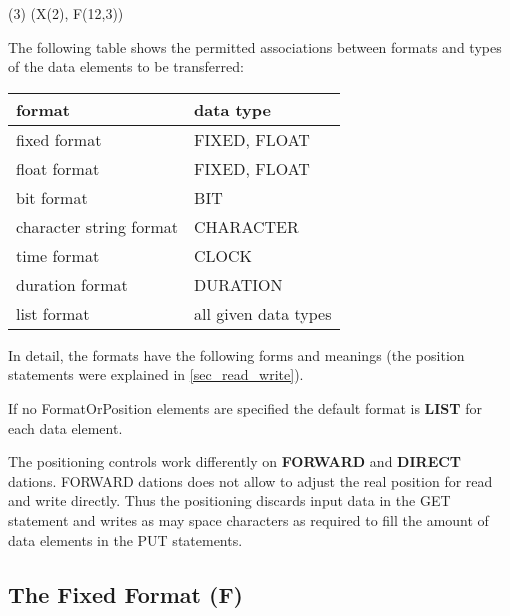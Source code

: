 (3) (X(2), F(12,3))

The following table shows the permitted associations between formats and
types of the data elements to be transferred:

\begin{tabular}{ll}
format                  & data type \\ \hline
fixed format            & FIXED, FLOAT \\
float format            & FIXED, FLOAT \\
bit format              & BIT          \\
character string format & CHARACTER    \\
time format             & CLOCK        \\
duration format         & DURATION     \\
list format             & all given data types
\end{tabular}

In detail, the formats have the following forms and meanings (the
position statements were explained in \ref{sec_read_write}).

\begin{modified}
If no FormatOrPosition elements are specified the default format is {\bf LIST}
 for each data element.
\end{modified}

The positioning controls work differently on {\bf FORWARD} and {\bf DIRECT}
dations. FORWARD dations does not allow to adjust the real position for read
and write directly. 
Thus the positioning discards input data in the GET statement and 
writes as may space characters as required to fill the amount of data elements
in the PUT statements.


\subsection{The Fixed Format (F)}   %
\label{sec_dation_f_format}







